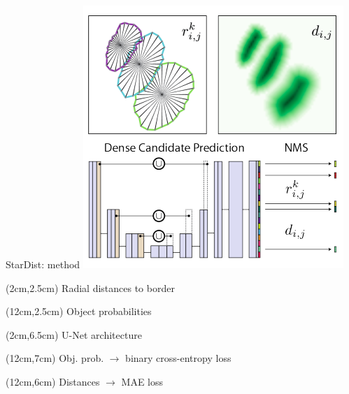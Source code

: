 \documentclass[9pt, aspectratio=169]{beamer}
\begin{document}
\begin{frame}
    {StarDist: method}
    \centering
    \includegraphics[width=.5\textwidth]{Schmidt2018_process.png}

    \begin{textblock*}{2cm}(2cm,2.5cm)
        Radial distances to border
    \end{textblock*}

    \begin{textblock*}{2cm}(12cm,2.5cm)
        Object probabilities
    \end{textblock*}

    \begin{textblock*}{2cm}(2cm,6.5cm)
        U-Net architecture
    \end{textblock*}

    \begin{textblock*}{4cm}(12cm,7cm)
        Obj. prob. $\rightarrow$ binary cross-entropy loss
    \end{textblock*}

    \begin{textblock*}{4cm}(12cm,6cm)
        Distances $\rightarrow$ MAE loss
    \end{textblock*}
\end{frame}
\end{document}

